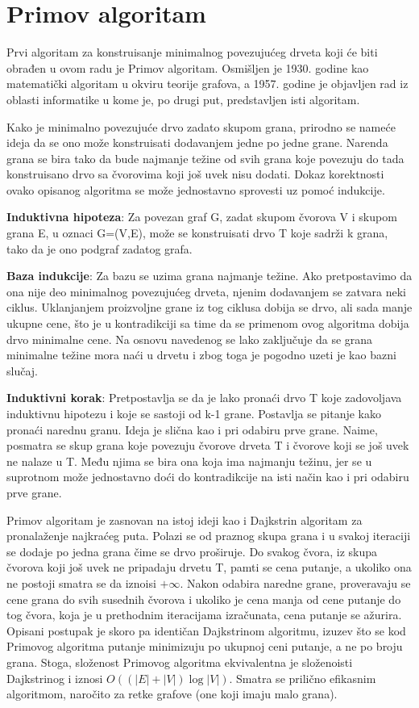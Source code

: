 \documentclass[12pt,oneside]{memoir}
\begin{document}
\section{Primov algoritam}
Prvi algoritam za konstruisanje minimalnog povezujućeg drveta koji će biti obrađen u ovom radu je Primov algoritam. Osmišljen je 1930. godine kao matematički algoritam u okviru teorije grafova, a 1957. godine je objavljen rad iz oblasti informatike u kome je, po drugi put, predstavljen isti algoritam.

Kako je minimalno povezujuće drvo zadato skupom grana, prirodno se nameće ideja da se ono može konstruisati dodavanjem jedne po jedne grane. Narenda grana se bira tako da bude najmanje težine od svih grana koje povezuju do tada konstruisano drvo sa čvorovima koji još uvek nisu dodati. Dokaz korektnosti ovako opisanog algoritma se može jednostavno sprovesti uz pomoć indukcije.

\textbf{Induktivna hipoteza}: Za povezan graf G, zadat skupom čvorova V i skupom grana E, u oznaci G=(V,E), može se konstruisati drvo T koje sadrži k grana, tako da je ono podgraf zadatog grafa.

\textbf{Baza indukcije}: Za bazu se uzima grana najmanje težine. Ako pretpostavimo da ona nije deo minimalnog povezujućeg drveta, njenim dodavanjem se zatvara neki ciklus. Uklanjanjem proizvoljne grane iz tog ciklusa dobija se drvo, ali sada manje ukupne cene, što je u kontradikciji sa time da se primenom ovog algoritma dobija drvo minimalne cene. Na osnovu navedenog se lako zaključuje da se grana minimalne težine mora naći u drvetu i zbog toga je pogodno uzeti je kao bazni slučaj.

\textbf{Induktivni korak}: Pretpostavlja se da je lako pronaći drvo T koje zadovoljava induktivnu hipotezu i koje se sastoji od k-1 grane. Postavlja se pitanje kako pronaći narednu granu. Ideja je slična kao i pri odabiru prve grane. Naime, posmatra se skup grana koje povezuju čvorove drveta T i čvorove koji se još uvek ne nalaze u T. Među njima se bira ona koja ima najmanju težinu, jer se u suprotnom može jednostavno doći do kontradikcije na isti način kao i pri odabiru prve grane.

Primov algoritam je zasnovan na istoj ideji kao i Dajkstrin algoritam za pronalaženje najkraćeg puta. Polazi se od praznog skupa grana i u svakoj iteraciji se dodaje po jedna grana čime se drvo proširuje. Do svakog čvora, iz skupa čvorova koji još uvek ne pripadaju drvetu T, pamti se cena putanje, a ukoliko ona ne postoji smatra se da iznoisi \( +\infty \). Nakon odabira naredne grane, proveravaju se cene grana do svih susednih čvorova i ukoliko je cena manja od cene putanje do tog čvora, koja je u prethodnim iteracijama izračunata, cena putanje se ažurira. Opisani postupak je skoro pa identičan Dajkstrinom algoritmu, izuzev što se kod Primovog algoritma putanje minimizuju po ukupnoj ceni putanje, a ne po broju grana. Stoga, složenost Primovog algoritma ekvivalentna je složenoisti Dajkstrinog i iznosi \( O((|E| + |V|) \log |V|) \). Smatra se prilično efikasnim algoritmom, naročito za retke grafove (one koji imaju malo grana).\\
\end{document}
